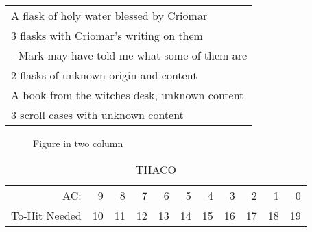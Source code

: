 \documentclass[a4paper]{article}
\begin{document}
\begin{multicols}{2}
\begin{table}[H]
\begin{center}
\begin{tabular}{l}
      A flask of holy water blessed by Criomar\\
      3 flasks with Criomar's writing on them\\
        - Mark may have told me what some of them are\\
      2 flasks of unknown origin and content\\
      A book from the witches desk, unknown content\\
      3 scroll cases with unknown content\\
    \end{tabular}
  \end{center}
\end{table}
\begin{figure}[H]
  \centering
  \caption{Figure in two column}
\end{figure}
\end{multicols}
\begin{table}[H]
  \begin{center}
    \caption*{THACO}
    \begin{tabular}{r|r|r|r|r|r|r|r|r|r|r} %
      AC: & 9 & 8 & 7 & 6 & 5 & 4 & 3 & 2 & 1 & 0\\
      To-Hit Needed & 10 & 11 & 12 & 13 & 14 & 15 & 16 & 17 & 18 & 19\\
    \end{tabular}
  \end{center}
\end{table}
\end{document}
